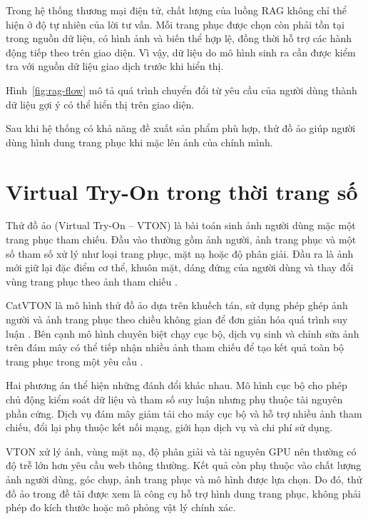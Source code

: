 Trong hệ thống thương mại điện tử, chất lượng của luồng RAG không chỉ thể hiện ở độ tự nhiên của lời tư vấn. Mỗi trang phục được chọn còn phải tồn tại trong nguồn dữ liệu, có hình ảnh và biến thể hợp lệ, đồng thời hỗ trợ các hành động tiếp theo trên giao diện. Vì vậy, dữ liệu do mô hình sinh ra cần được kiểm tra với nguồn dữ liệu giao dịch trước khi hiển thị.

\medskip

Hình~\ref{fig:rag-flow} mô tả quá trình chuyển đổi từ yêu cầu của người dùng thành dữ liệu gợi ý có thể hiển thị trên giao diện.



\medskip

Sau khi hệ thống có khả năng đề xuất sản phẩm phù hợp, thử đồ ảo giúp người dùng hình dung trang phục khi mặc lên ảnh của chính mình.

\section{Virtual Try-On trong thời trang số}

Thử đồ ảo (Virtual Try-On -- VTON) là bài toán sinh ảnh người dùng mặc một trang phục tham chiếu. Đầu vào thường gồm ảnh người, ảnh trang phục và một số tham số xử lý như loại trang phục, mặt nạ hoặc độ phân giải. Đầu ra là ảnh mới giữ lại đặc điểm cơ thể, khuôn mặt, dáng đứng của người dùng và thay đổi vùng trang phục theo ảnh tham chiếu \cite{catvton}.

\medskip

CatVTON là mô hình thử đồ ảo dựa trên khuếch tán, sử dụng phép ghép ảnh người và ảnh trang phục theo chiều không gian để đơn giản hóa quá trình suy luận \cite{catvton}. Bên cạnh mô hình chuyên biệt chạy cục bộ, dịch vụ sinh và chỉnh sửa ảnh trên đám mây có thể tiếp nhận nhiều ảnh tham chiếu để tạo kết quả toàn bộ trang phục trong một yêu cầu \cite{replicate}.

\medskip

Hai phương án thể hiện những đánh đổi khác nhau. Mô hình cục bộ cho phép chủ động kiểm soát dữ liệu và tham số suy luận nhưng phụ thuộc tài nguyên phần cứng. Dịch vụ đám mây giảm tải cho máy cục bộ và hỗ trợ nhiều ảnh tham chiếu, đổi lại phụ thuộc kết nối mạng, giới hạn dịch vụ và chi phí sử dụng.

\medskip

VTON xử lý ảnh, vùng mặt nạ, độ phân giải và tài nguyên GPU nên thường có độ trễ lớn hơn yêu cầu web thông thường. Kết quả còn phụ thuộc vào chất lượng ảnh người dùng, góc chụp, ảnh trang phục và mô hình được lựa chọn. Do đó, thử đồ ảo trong đề tài được xem là công cụ hỗ trợ hình dung trang phục, không phải phép đo kích thước hoặc mô phỏng vật lý chính xác.

